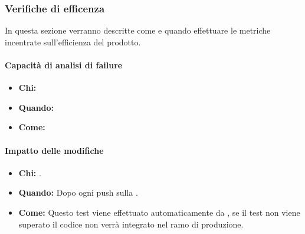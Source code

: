 \newpage
\subsubsection{Verifiche di efficenza}
In questa sezione verranno descritte come e quando effettuare le metriche incentrate sull'efficienza del prodotto.

\paragraph{Capacità di analisi di failure}
\begin{itemize}
\item \textbf{Chi:}
\item \textbf{Quando:}
\item \textbf{Come:}
\end{itemize}

\paragraph{Impatto delle modifiche}
\begin{itemize}
\item \textbf{Chi:} .
\item \textbf{Quando:} Dopo ogni push sulla .
\item \textbf{Come:} Questo test viene effettuato automaticamente da , se il test non viene superato il codice non verrà integrato nel ramo di produzione.
\end{itemize}
